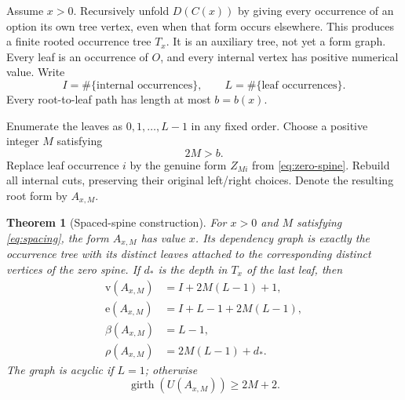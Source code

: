 \documentclass[11pt,a4paper]{article}
\numberwithin{equation}{section}
\newtheorem{theorem}{Theorem}[section]
\theoremstyle{definition}
\theoremstyle{remark}
\newcommand{\rk}{\rho}
\newcommand{\gir}{\operatorname{girth}}
\newcommand{\can}{C}
\newcommand{\sizeV}{\mathrm{v}}
\newcommand{\sizeE}{\mathrm{e}}
\begin{document}
Assume $x>0$. Recursively unfold $D(\can(x))$ by giving every occurrence of an
option its own tree vertex, even when that form occurs elsewhere. This produces
a finite rooted occurrence tree $T_x$. It is an auxiliary tree, not yet a form
graph. Every leaf is an occurrence of $O$, and every internal vertex has
positive numerical value. Write
\begin{equation}
 I=\#\{\text{internal occurrences}\},\qquad
 L=\#\{\text{leaf occurrences}\}.
\end{equation}
Every root-to-leaf path has length at most $b=b(x)$.

Enumerate the leaves as $0,1,\ldots,L-1$ in any fixed order. Choose a positive
integer $M$ satisfying
\begin{equation}
\label{eq:spacing}
 2M>b.
\end{equation}
Replace leaf occurrence $i$ by the genuine form $Z_{Mi}$ from
\eqref{eq:zero-spine}. Rebuild all internal cuts, preserving their original
left/right choices. Denote the resulting root form by $A_{x,M}$.

\begin{theorem}[Spaced-spine construction]
\label{thm:high-girth}
For $x>0$ and $M$ satisfying \eqref{eq:spacing}, the form $A_{x,M}$ has value
$x$. Its dependency graph is exactly the occurrence tree with its distinct
leaves attached to the corresponding distinct vertices of the zero spine.
If $d_*$ is the depth in $T_x$ of the last leaf, then
\begin{align}
 \sizeV(A_{x,M})&=I+2M(L-1)+1,\label{eq:high-V}\\
 \sizeE(A_{x,M})&=I+L-1+2M(L-1),\label{eq:high-E}\\
 \beta(A_{x,M})&=L-1,\label{eq:high-beta}\\
 \rk(A_{x,M})&=2M(L-1)+d_* .\label{eq:high-rank}
\end{align}
The graph is acyclic if $L=1$; otherwise
\begin{equation}
\label{eq:high-girth}
 \gir(U(A_{x,M}))\geq2M+2.
\end{equation}
\end{theorem}
\end{document}

